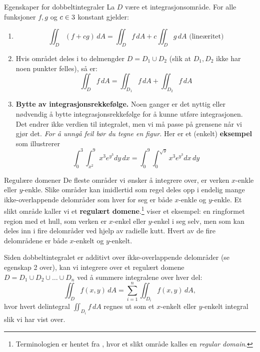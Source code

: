\begin{oppsum}{Egenskaper for dobbeltintegraler}
La $D$ være et integrasjonsområde. For alle funksjoner $f,g$ og $c \in 3$ konstant gjelder:
\begin{enumerate}
  \item \[\iint_D (f + cg)\, dA = \iint_D f\, dA + c\iint_D g\, dA \text{  (lineæritet)}\] 
  \item Hvis området deles i to delmengder \( D = D_1 \cup D_2 \)  (slik at $D_1, D_2$ ikke har noen punkter felles), så er:
  \[\iint_D f\, dA = \iint_{D_1} f\, dA + \iint_{D_2} f\, dA\]
\item \textbf{Bytte av integrasjonsrekkefølge.} 
Noen ganger er det nyttig eller nødvendig å bytte integrasjonsrekkefølge for å kunne utføre integrasjonen. Det endrer ikke verdien til integralet, men vi må passe på grensene når vi gjør det. \emph{For å unngå feil bør du tegne en figur.} Her er et (enkelt) \textbf{eksempel} som illustrerer
\[
\int_0^3 \int_{x^2}^9 x^3 e^{y^3} dy\, dx
= \int_0^9 \int_0^{\sqrt{y}} x^3 e^{y^3} dx\, dy
\]
\end{enumerate}
\end{oppsum}

\begin{rem}{Regulære domener}
De fleste områder vi ønsker å integrere over, er verken $x$-enkle eller $y$-enkle. Slike områder kan imidlertid som regel deles opp i endelig mange ikke-overlappende delområder som hver for seg er både $x$-enkle og $y$-enkle. Et slikt område kaller vi et \textbf{regulært domene}.\footnote{Terminologien er hentet fra \cite{Adams}, hvor et slikt område kalles en \emph{regular domain}.}  viser et eksempel: en ringformet region med et hull, som verken er $x$-enkel eller $y$-enkel i seg selv, men som kan deles inn i fire delområder ved hjelp av radielle kutt. Hvert av de fire delområdene er både $x$-enkelt og $y$-enkelt.

Siden dobbeltintegralet er additivt over ikke-overlappende delområder (se egenskap 2 over), kan vi integrere over et regulært domene $D = D_1 \cup D_2 \cup \dots \cup D_n$ ved å summere integralene over hver del:
\[
\iint_D f(x, y)\, dA = \sum_{i=1}^n \iint_{D_i} f(x, y)\, dA,
\]
hvor hvert delintegral $\iint_{D_i} f\, dA$ regnes ut som et $x$-enkelt eller $y$-enkelt integral slik vi har vist over.
\end{rem}

